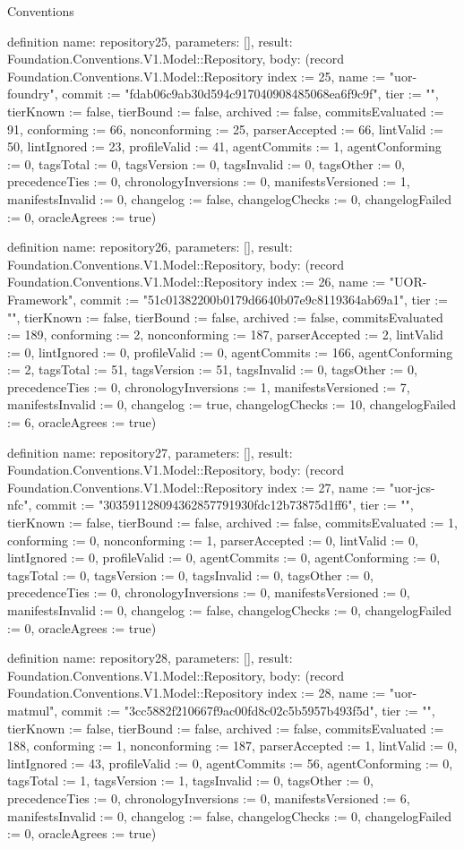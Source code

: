 \begin{lexlean}{Conventions}
\begin{semanticmodule}
definition{
  name: repository25,
  parameters: [],
  result: Foundation.Conventions.V1.Model::Repository,
  body: (record Foundation.Conventions.V1.Model::Repository {index := 25, name := "uor-foundry", commit := "fdab06c9ab30d594c917040908485068ea6f9c9f", tier := "", tierKnown := false, tierBound := false, archived := false, commitsEvaluated := 91, conforming := 66, nonconforming := 25, parserAccepted := 66, lintValid := 50, lintIgnored := 23, profileValid := 41, agentCommits := 1, agentConforming := 0, tagsTotal := 0, tagsVersion := 0, tagsInvalid := 0, tagsOther := 0, precedenceTies := 0, chronologyInversions := 0, manifestsVersioned := 1, manifestsInvalid := 0, changelog := false, changelogChecks := 0, changelogFailed := 0, oracleAgrees := true})
}

definition{
  name: repository26,
  parameters: [],
  result: Foundation.Conventions.V1.Model::Repository,
  body: (record Foundation.Conventions.V1.Model::Repository {index := 26, name := "UOR-Framework", commit := "51c01382200b0179d6640b07e9c8119364ab69a1", tier := "", tierKnown := false, tierBound := false, archived := false, commitsEvaluated := 189, conforming := 2, nonconforming := 187, parserAccepted := 2, lintValid := 0, lintIgnored := 0, profileValid := 0, agentCommits := 166, agentConforming := 2, tagsTotal := 51, tagsVersion := 51, tagsInvalid := 0, tagsOther := 0, precedenceTies := 0, chronologyInversions := 1, manifestsVersioned := 7, manifestsInvalid := 0, changelog := true, changelogChecks := 10, changelogFailed := 6, oracleAgrees := true})
}

definition{
  name: repository27,
  parameters: [],
  result: Foundation.Conventions.V1.Model::Repository,
  body: (record Foundation.Conventions.V1.Model::Repository {index := 27, name := "uor-jcs-nfc", commit := "303591128094362857791930fdc12b73875d1ff6", tier := "", tierKnown := false, tierBound := false, archived := false, commitsEvaluated := 1, conforming := 0, nonconforming := 1, parserAccepted := 0, lintValid := 0, lintIgnored := 0, profileValid := 0, agentCommits := 0, agentConforming := 0, tagsTotal := 0, tagsVersion := 0, tagsInvalid := 0, tagsOther := 0, precedenceTies := 0, chronologyInversions := 0, manifestsVersioned := 0, manifestsInvalid := 0, changelog := false, changelogChecks := 0, changelogFailed := 0, oracleAgrees := true})
}

definition{
  name: repository28,
  parameters: [],
  result: Foundation.Conventions.V1.Model::Repository,
  body: (record Foundation.Conventions.V1.Model::Repository {index := 28, name := "uor-matmul", commit := "3cc5882f210667f9ac00fd8c02c5b5957b493f5d", tier := "", tierKnown := false, tierBound := false, archived := false, commitsEvaluated := 188, conforming := 1, nonconforming := 187, parserAccepted := 1, lintValid := 0, lintIgnored := 43, profileValid := 0, agentCommits := 56, agentConforming := 0, tagsTotal := 1, tagsVersion := 1, tagsInvalid := 0, tagsOther := 0, precedenceTies := 0, chronologyInversions := 0, manifestsVersioned := 6, manifestsInvalid := 0, changelog := false, changelogChecks := 0, changelogFailed := 0, oracleAgrees := true})
}


\end{semanticmodule}
\end{lexlean}

